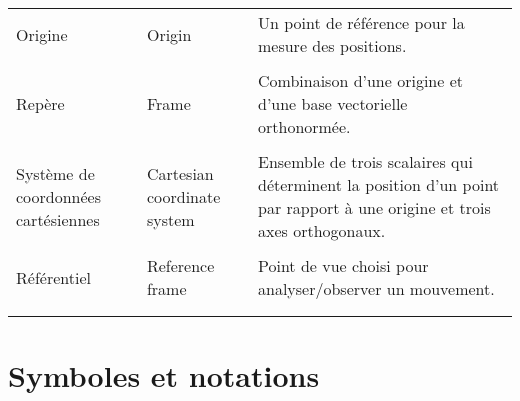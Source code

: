 \begin{center}
\begin{tabular}{  p{3.5cm} p{3.5cm} p{7cm} }
Origine &  Origin &
Un point de référence pour la mesure des positions.
\\  &  \\ 
Repère &  Frame &
Combinaison d'une origine et d'une base vectorielle orthonormée.
\\  &  \\ 
Système de coordonnées cartésiennes & Cartesian coordinate system &
Ensemble de trois scalaires qui déterminent la position d'un point par rapport à une origine et trois axes orthogonaux. %
\\   &  \\  
Référentiel & Reference frame &
Point de vue choisi pour analyser/observer un mouvement.
\\  &  \\ 
\hline
\label{tab}
\end{tabular}
\end{center}

\section{Symboles et notations}

